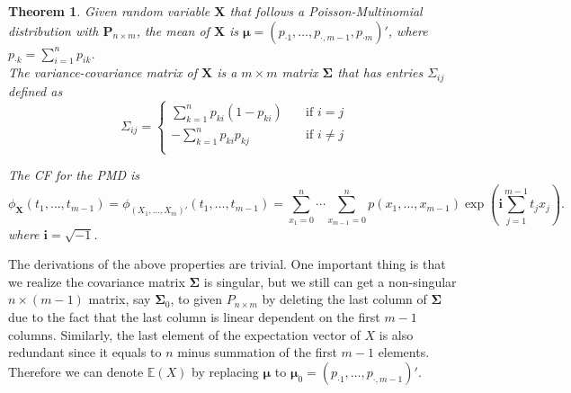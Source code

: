 \documentclass[12pt]{article}
\newcommand{\EE}{\mathbb{E}}
\newcommand{\Xmat}{\mathbf{X}}
\newcommand{\Pmat}{\mathbf{P}}
\newcommand{\ivec}{{\boldsymbol{i}}}
\newtheorem{thm}{Theorem}
\begin{document}
\begin{thm}
Given random variable $\Xmat$ that follows a Poisson-Multinomial distribution with $\Pmat_{n\times m}$, the mean of $\Xmat$ is
   $\boldsymbol{\mu} = \left( p_{\cdot1} ,\dots,p_{\cdot,m-1},p_{\cdot m}\right)'$, where $p_{\cdot k} = \sum_{i=1}^{n}p_{i k}$. \\
The variance-covariance matrix of $\Xmat$ is a $m \times m$ matrix $\boldsymbol{\Sigma}$ that has entries $\Sigma_{ij}$ defined as
\begin{equation*}
   \Sigma_{ij} =
           \begin{cases}
             \sum_{k=1}^{n}p_{ki}(1-p_{ki}) & \quad \text{if } i=j\\
             -\sum_{k=1}^{n}p_{ki}p_{kj} & \quad \text{if } i \neq j\\
           \end{cases}
\end{equation*}

The CF for the PMD is
\begin{equation*}
\phi_{\Xmat}(t_1, \dots, t_{m-1}) = \phi_{(X_1,\dots,X_m)'}(t_1, \dots, t_{m-1})  =  \sum_{x_1 = 0}^{n}\cdots \sum_{x_{m-1} = 0}^n p(x_1,\ldots,x_{m-1})\exp\left(\ivec\sum_{j=1}^{m-1}t_jx_j\right).
\end{equation*}
where  $\ivec=\sqrt{-1}$.
\end{thm}
The derivations of the above properties are trivial. One important thing is that we realize the covariance matrix $\boldsymbol{\Sigma}$ is singular, but we still can get a non-singular $n \times (m-1)$ matrix, say $\boldsymbol{\Sigma}_{0}$, to given $P_{n \times m}$ by deleting the last column of $\boldsymbol{\Sigma}$ due to the fact that the last column is linear dependent on the first $m-1$ columns. Similarly, the last element of the expectation vector of $X$ is also redundant since it equals to $n$ minus summation of the first $m-1$ elements. Therefore we can denote $\EE(X)$ by replacing $\boldsymbol{\mu}$ to $\boldsymbol{\mu}_0 = \left( p_{\cdot1} ,\dots,p_{\cdot,m-1}\right)'$.
\end{document}
